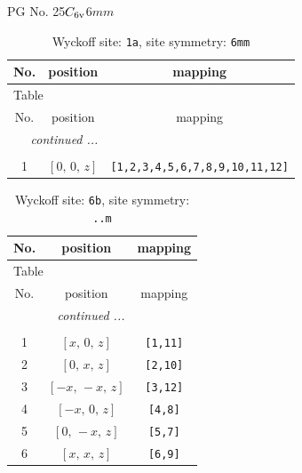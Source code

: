 \documentclass[fleqn,8pt]{jsarticle}
\begin{document}
\setcounter{MaxMatrixCols}{32}

\renewcommand{\tablename}{Table~}
\renewcommand{\figurename}{Figure~}
\begin{center}
\LARGE
PG No. 25\quad$C_{\rm 6v}$\quad$6mm$\quad[ hexagonal ]
\end{center}
\renewcommand{\arraystretch}{1.2}
\begin{longtable}{ccc}
\caption{Wyckoff site: {\tt 1a}, site symmetry: {\tt 6mm}}
 \\
 \hline \hline
No. & position & mapping \\ \hline \endfirsthead

\multicolumn{2}{l}{\tablename\ \thetable{}} \\
 \hline \hline
No. & position & mapping \\ \hline \endhead

 \hline \hline
\multicolumn{2}{r}{\footnotesize\it continued ...} \\ \endfoot

 \hline \hline
\multicolumn{2}{r}{} \\ \endlastfoot

1 & $\left[ 0,\, 0,\, z \right]$ & {\tt [1,2,3,4,5,6,7,8,9,10,11,12]} \\
\end{longtable}
\renewcommand{\arraystretch}{1.2}
\begin{longtable}{ccc}
\caption{Wyckoff site: {\tt 6b}, site symmetry: {\tt ..m}}
 \\
 \hline \hline
No. & position & mapping \\ \hline \endfirsthead

\multicolumn{2}{l}{\tablename\ \thetable{}} \\
 \hline \hline
No. & position & mapping \\ \hline \endhead

 \hline \hline
\multicolumn{2}{r}{\footnotesize\it continued ...} \\ \endfoot

 \hline \hline
\multicolumn{2}{r}{} \\ \endlastfoot

1 & $\left[ x,\, 0,\, z \right]$ & {\tt [1,11]} \\ \hline
2 & $\left[ 0,\, x,\, z \right]$ & {\tt [2,10]} \\ \hline
3 & $\left[ - x,\, - x,\, z \right]$ & {\tt [3,12]} \\ \hline
4 & $\left[ - x,\, 0,\, z \right]$ & {\tt [4,8]} \\ \hline
5 & $\left[ 0,\, - x,\, z \right]$ & {\tt [5,7]} \\ \hline
6 & $\left[ x,\, x,\, z \right]$ & {\tt [6,9]} \\
\end{longtable}
\end{document}
